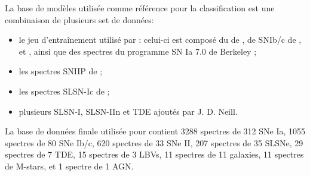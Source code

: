 \documentclass[../main/main.tex]{subfiles}
\begin{document}
La base de modèles utilisée comme référence pour la classification est
une combinaison de plusieurs set de données:
\begin{itemize}
  \item le jeu d'entraînement utilisé par 
    \citep{MuthukrishnaDash}: celui-ci est composé du 
    de , de SNIb/c de \citet{Liu2014SNIbc},
    \citet{Mojdaz2016} et \citet{Liu2016}, ainsi que des spectres du programme SN Ia 7.0
    de Berkeley \citep{Silverman2012};
  \item les spectres SNIIP de \citet{GutierrezSNII};
  \item les spectres SLSN-Ic de \citet{Liu2017SLSN};
  \item plusieurs SLSN-I, SLSN-IIn et TDE ajoutés par J. D. Neill.
\end{itemize}

La base de données finale utilisée pour  contient 3288
spectres de 312 SNe Ia, 1055 spectres de 80 SNe Ib/c, 620 spectres de 33
SNe II, 207 spectres de 35 SLSNe, 29 spectres de 7 TDE, 15 spectres de 3
LBVs, 11 spectres de 11 galaxies, 11 spectres de M-stars, et 1 spectre
de 1 AGN.
\end{document}
